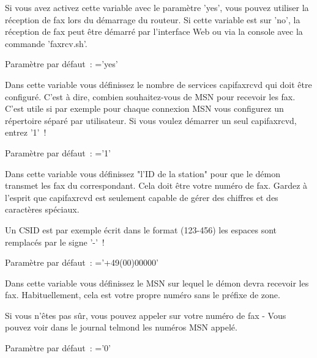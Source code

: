 \begin{description}


    {Si vous avez activez cette variable avec le paramètre 'yes', vous pouvez
	utiliser la réception de fax lors du démarrage du routeur. Si cette variable
	est sur 'no', la réception de fax peut être démarré par l'interface Web
	ou via la console avec la commande 'faxrcv.sh'.

        Paramètre par défaut~: ='yes'}


    {Dans cette variable vous définissez le nombre de services capifaxrcvd qui
	doit être configuré. C'est à dire, combien souhaitez-vous de MSN pour recevoir
	les fax. C'est utile si par exemple pour chaque connexion MSN vous configurez
	un répertoire séparé par utilisateur. Si vous voulez démarrer un seul capifaxrcvd,
	entrez '1'~!

        Paramètre par défaut~: ='1'}


    {Dans cette variable vous définissez "l'ID de la station" pour que le démon
	transmet les fax du correspondant. Cela doit être votre numéro de fax. Gardez
	à l'esprit que capifaxrcvd est seulement capable de gérer des chiffres et
	des caractères spéciaux.

    Un CSID est par exemple écrit dans le format (123-456) les espaces sont remplacés
	par le signe '-'~!

        Paramètre par défaut~: ='+49(00)00000'}



    {Dans cette variable vous définissez le MSN sur lequel le démon devra recevoir
	les fax. Habituellement, cela est votre propre numéro sans le préfixe de zone.

     Si
	vous n'êtes pas sûr, vous pouvez appeler sur votre numéro de fax - Vous pouvez
	voir dans le journal telmond les numéros MSN appelé.

        Paramètre par défaut~: ='0'}


\end{description}
